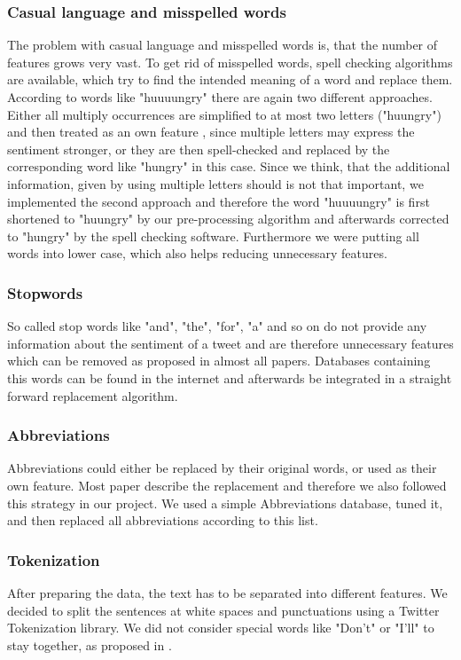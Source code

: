 \documentclass{sig-alternate}
\begin{document}
\subsubsection{Casual language and misspelled words}
The problem with casual language and misspelled words is, that the number of features grows very vast. To get rid of misspelled words, spell checking algorithms are available, which try to find the intended meaning of a word and replace them. According to words like "huuuungry" there are again two different approaches. Either all multiply occurrences are simplified to at most two letters ("huungry") and then treated as an own feature \cite{Anthony2010Twitter}, since multiple letters may express the sentiment stronger, or they are then spell-checked and replaced by the corresponding word like "hungry" in this case. Since we think, that the additional information, given by using multiple letters should is not that important, we implemented the second approach and therefore the word "huuuungry" is first shortened to "huungry" by our pre-processing algorithm and afterwards corrected to "hungry" by the spell checking software. Furthermore we were putting all words into lower case, which also helps reducing unnecessary features.

\subsubsection{Stopwords}
So called stop words like "and", "the", "for", "a" and so on do not provide any information about the sentiment of a tweet and are therefore unnecessary features which can be removed as proposed in almost all papers. Databases containing this words can be found in the internet and afterwards be integrated in a straight forward replacement algorithm.

\subsubsection{Abbreviations}
Abbreviations could either be replaced by their original words, or used as their own feature. Most paper describe the replacement and therefore we also followed this strategy in our project. We used a simple Abbreviations database, tuned it, and then replaced all abbreviations according to this list.

\subsubsection{Tokenization}
After preparing the data, the text has to be separated into different features. We decided to split the sentences at white spaces and punctuations using a Twitter Tokenization library. We did not consider special words like "Don't" or "I'll" to stay together, as proposed in \cite{AlexanderTwitter}.
\end{document}
